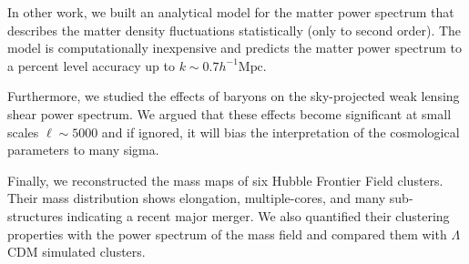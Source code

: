 In other work, we built an analytical model for the matter power spectrum that
describes the matter density fluctuations statistically (only to second 
order). The model is computationally inexpensive and predicts the
matter power spectrum to a percent level accuracy up to 
$k\sim 0.7 h^{-1}\mathrm{Mpc}$. 

Furthermore, we studied the effects of baryons on the sky-projected weak lensing
shear power spectrum. We argued that these effects become significant
at small scales $\ell \sim 5000$ and if ignored, it will bias the
interpretation of the cosmological parameters to many sigma.

Finally, we reconstructed the mass maps of six Hubble Frontier Field clusters.
Their mass distribution shows elongation, multiple-cores, and many sub-structures
indicating a recent major merger. We also quantified their clustering 
properties with the power spectrum of the mass field and compared them
with $\Lambda$CDM simulated clusters.


